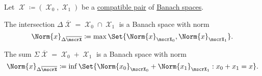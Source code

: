 \begin{proposition}\label{def:banach_space_sum_and_intersection_norms}
  Let \( \mscrX \coloneqq (\mscrX_0, \mscrX_1) \) be a \hyperref[def:interpolated_topological_vector_space/compatibility]{compatible pair} of \hyperref[def:banach_space]{Banach spaces}.

  \begin{PropEnum}
     The intersection \( \Delta \overline{\mscrX} = \mscrX_0 \cap \mscrX_1 \) is a Banach space with norm
    \begin{equation}\label{eq:def:banach_space_sum_and_intersection_norms/intersection}
      \Norm{x}_{\Delta \overline{\mscrX}} \coloneqq \max \Set{ \Norm{x}_{\mscrX_0}, \Norm{x}_{\mscrX_1} }.
    \end{equation}

     The sum \( \Sigma \overline{\mscrX} = \mscrX_0 + \mscrX_1 \) is a Banach space with norm
    \begin{equation}\label{eq:def:banach_space_sum_and_intersection_norms/sum}
      \Norm{x}_{\Delta \overline{\mscrX}} \coloneqq \inf \Set{ \Norm{x_0}_{\mscrX_0} + \Norm{x_1}_{\mscrX_1} : x_0 + x_1 = x }.
    \end{equation}
  \end{PropEnum}
\end{proposition}
